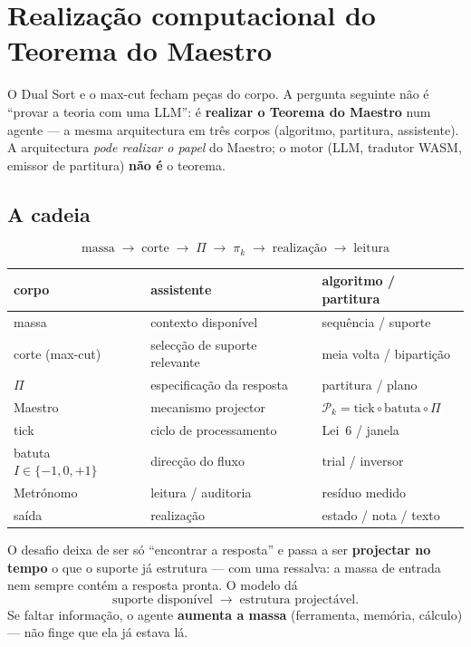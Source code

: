 \documentclass[11pt,a4paper]{article}
\begin{document}
\section{Realização computacional do Teorema do Maestro}\label{sec:assistente}

O Dual Sort e o max-cut fecham peças do corpo. A pergunta seguinte não é ``provar a teoria com uma
LLM'': é \textbf{realizar o Teorema do Maestro} num agente --- a mesma arquitectura em três corpos
(algoritmo, partitura, assistente). A arquitectura \emph{pode realizar o papel} do Maestro; o motor
(LLM, tradutor WASM, emissor de partitura) \textbf{não é} o teorema.

\subsection*{A cadeia}

\[
\boxed{
\text{massa}
\;\longrightarrow\;
\text{corte}
\;\longrightarrow\;
\Pi
\;\longrightarrow\;
\pi_k
\;\longrightarrow\;
\text{realização}
\;\longrightarrow\;
\text{leitura}
}
\]

\begin{center}\small
\begin{tabular}{@{}lll@{}}
\toprule
corpo & assistente & algoritmo / partitura \\
\midrule
massa & contexto disponível & sequência / suporte \\
corte (max-cut) & selecção de suporte relevante & meia volta / bipartição \\
$\Pi$ & especificação da resposta & partitura / plano \\
Maestro & mecanismo projector & $\mathcal{P}_k=\mathrm{tick}\circ\mathrm{batuta}\circ\Pi$ \\
tick & ciclo de processamento & Lei~6 / janela \\
batuta $I\in\{-1,0,+1\}$ & direcção do fluxo & trial / inversor \\
Metrónomo & leitura / auditoria & resíduo medido \\
saída & realização & estado / nota / texto \\
\bottomrule
\end{tabular}
\end{center}

\noindent O desafio deixa de ser só ``encontrar a resposta'' e passa a ser \textbf{projectar no
tempo} o que o suporte já estrutura --- com uma ressalva: a massa de entrada nem sempre contém a
resposta pronta. O modelo dá
\[
  \text{suporte disponível}
  \;\longrightarrow\;
  \text{estrutura projectável}.
\]
Se faltar informação, o agente \textbf{aumenta a massa} (ferramenta, memória, cálculo) --- não
finge que ela já estava lá.
\end{document}
